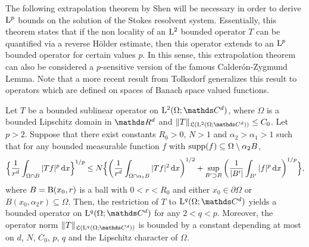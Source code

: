 

The following extrapolation theorem by Shen \cite[Thm.\@~3.3]{shenExtra} will be necessary in order to derive $\mathrm{L}^p$ bounds on the solution of the Stokes resolvent system.
Essentially, this theorem states that if the non locality of an $\mathrm{L}^2$ bounded operator  $T$ can be quantified via a reverse Hölder estimate, then this operator extends to an $\mathrm{L}^p$ bounded operator for certain values $p$.
In this sense, this extrapolation theorem can also be considered a $p$-sensitive version of the famous Calder\'on-Zygmund Lemma.
Note that a more recent result from Tolksdorf \cite[Thm.\@~4.1]{tolksdorf2017} generalizes this result to operators which are defined on spaces of Banach space valued functions.

\begin{thm}
  \label{thm:extrapolation}
  Let $T$ be a bounded sublinear operator on $\Ell^2(\Omega; \C^d)$, where $\Omega$ is a bounded Lipschitz domain in $\R^d$ and $\|T\|_{\Li(\Ell^2(\Omega; \C^d))} \leq C_0$.
  Let $p > 2$.
  Suppose that there exist constants $R_0 > 0$, $N > 1$ and $\alpha_2 > \alpha_1 > 1$ such that for any bounded measurable function $f$ with $\operatorname{supp}(f) \subseteq \Omega \setminus \alpha_2 B$,
  \begin{align*}
    \Big\{ \frac{1}{r^d} \int_{\Omega \cap B} |Tf|^p \, {\operatorname{d}\!{x}} \Big\}^{1/p}
    \leq N \Big\{ \bigg( \frac{1}{r^d} \int_{\Omega \cap \alpha_1 B} |T f|^2 \, {\operatorname{d}\!{x}} \bigg)^{1/2} + \sup_{B' \supset B} \bigg( \frac{1}{|B'|} \int_{B'} |f|^p \, {\operatorname{d}\!{x}} \bigg)^{1/p} \Big\},
  \end{align*}
  where $B = \mathrm{B}(x_0, r)$ is a ball with $0 < r < R_0$ and either $x_0 \in \partial\Omega$ or $B(x_0, \alpha_2 r) \subseteq \Omega$.
  Then, the restriction of $T$ to $\Ell^q(\Omega;\C^d)$ yields a bounded operator on $\Ell^q(\Omega; \C^d)$ for any $2 < q < p$.
  Moreover, the operator norm $\|T\|_{\Li(\Ell^q(\Omega; \C^d))}$ is bounded by a constant depending at most on $d$, $N$, $C_0$, $p$, $q$ and the Lipschitz character of $\Omega$.
\end{thm}

